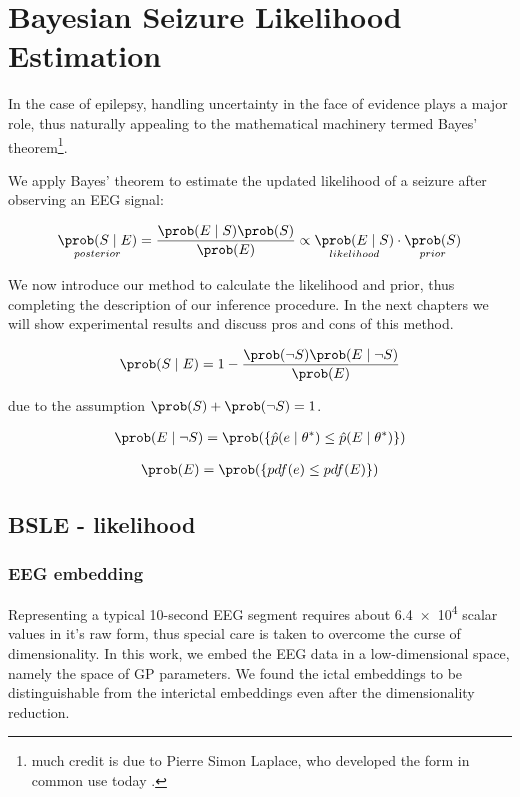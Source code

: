 \section{Bayesian Seizure Likelihood Estimation}

In the case of epilepsy, handling uncertainty in the face of evidence plays a major role, thus naturally appealing to the mathematical machinery termed Bayes' theorem\footnote{much credit is due to Pierre Simon Laplace, who developed the form in common use today \cite{mcgrayne2011theory}.}.

We apply Bayes' theorem to estimate the updated likelihood of a seizure after observing an EEG signal:

\begin{align}
    \underset{posterior}{\prob(S \mid E)} = \frac{\prob(E \mid S) \prob(S)}{\prob(E)} \propto \underset{likelihood}{\prob(E \mid S)} \cdot \underset{prior}{\prob(S)}
\end{align}

We now introduce our method to calculate the likelihood and prior, thus completing the description of our inference procedure. In the next chapters we will show experimental results and discuss pros and cons of this method.

\begin{align}
    \prob(S \mid E) = 1 - \frac{\prob(\neg S) \prob(E \mid \neg S)}{\prob (E)}
\end{align}

due to the assumption $\prob(S) + \prob(\neg S) = 1$.

\begin{align}
    \prob(E \mid \neg S) = \prob(\{\hat p (e \mid \theta^*) \leq \hat p(E \mid \theta^*)\})
\end{align}

\begin{align}
    \prob(E) = \prob(\{pdf(e) \leq pdf(E)\})
\end{align}
\subsection{BSLE - likelihood}

\subsubsection{EEG embedding}
Representing a typical 10-second EEG segment requires about \num{6.4e4} scalar values in it's raw form, thus special care is taken to overcome the curse of dimensionality. In this work, we embed the EEG data in a low-dimensional space, namely the space of GP parameters. We found the ictal embeddings to be distinguishable from the interictal embeddings even after the dimensionality reduction.

